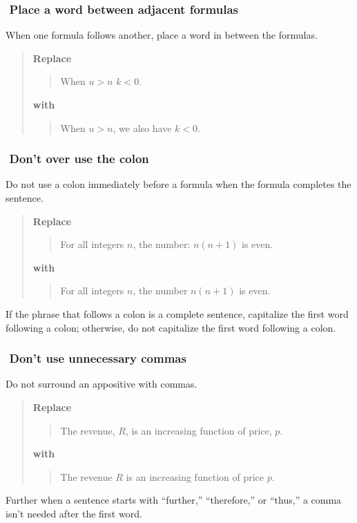 \documentclass[12pt]{article}
\newcounter{ex}\setcounter{ex}{0}
\newcommand{\ex}{%
\hspace{-0.2in} \setcounter{ex}{\value{ex}+1}
\theex \,\,}
\newcounter{se}\setcounter{se}{0}
\begin{document}
\subsubsection*{\ex Place a word between adjacent formulas}

When one formula follows another, place a word in between the formulas.

\begin{quote}
\textbf{\textbf{Replace}}
\begin{quote}
   When \(u > n\)  \(k < 0\).
\end{quote}
\textbf{with}
\begin{quote}
  When \(u > n\), we also have \(k < 0\).
\end{quote}
\end{quote}

\subsubsection*{\ex Don't over use the colon}

Do not use a colon immediately before a formula when the formula 
completes the sentence.

\begin{quote}
\textbf{\textbf{Replace}}
\begin{quote}
  For all integers \(n\), the number: \(n (n + 1) \) is even.
\end{quote}
\textbf{with}
\begin{quote}
   For all integers \(n\), the number \(n (n + 1) \) is even.
\end{quote}
\end{quote}
If the phrase that follows a colon is a complete sentence, 
capitalize the first word following a colon; otherwise, do
not capitalize the first word following a colon.
 
\subsubsection*{\ex Don't use unnecessary commas}

Do not surround an appositive with commas.

\begin{quote}
\textbf{\textbf{Replace}}
\begin{quote}
  The revenue, \(R\), is an increasing function of price, \(p\).
\end{quote}
\textbf{with}
\begin{quote}
  The revenue \(R\) is an increasing function of price \(p\).
\end{quote}
\end{quote}
Further when a sentence starts with ``further,'' ``therefore,'' or ``thus,''
a comma isn't needed after the first word.
\end{document}
